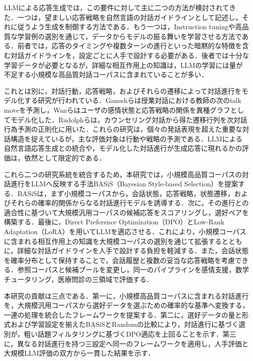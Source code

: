 \documentclass[manuscript,review,anonymous]{acmart}
\begin{document}
LLMによる応答生成では，この要件に対して主に二つの方法が検討されてきた．一つは，望ましい応答戦略を自然言語の対話ガイドラインとして記述し，それに従うよう生成を制御する方法である\cite{gupta2023dialguide,wen2025guidedtod}．もう一つは，Instruction tuningや高品質な学習例の選別を通じて，データからモデルの振る舞いを学習させる方法である\cite{zhou2023lima,zhang2025datasurvey}．前者では，応答のタイミングや複数ターンの進行といった暗黙的な特徴を含む対話ガイドラインを，設定ごとに人手で設計する必要がある．後者では十分な学習データが必要となるが，詳細な相互作用上の知識は，LLMの学習には量が不足する小規模な高品質対話コーパスに含まれていることが多い．

これとは別に，対話行動，応答戦略，およびそれらの遷移によって対話進行をモデル化する研究が行われている．Ganeshらは授業対話における教師の次のtalk moveを予測し\cite{ganesh2021teacher}，Wanらはユーザの感情状態と応答戦略の関係を異種グラフとしてモデル化した\cite{wan2025emodynamix}．Rudolphらは，カウンセリング対話から得た遷移行列を次対話行為予測の正則化に用いた\cite{rudolph2026transition}．これらの研究は，個々の発話表現を超えた重要な対話構造を捉えているが，主な評価対象は行動や戦略の予測である．LLMによる自然言語応答生成との統合や，モデル化した対話進行が生成応答に現れるかの評価は，依然として限定的である．

これら二つの研究系統を統合するため，本研究では，小規模高品質コーパスの対話進行をLLMへ反映する手法BASiS（Bayesian Style-based Selection）を提案する．BASiSは，まず小規模コーパスから，会話状態，応答戦略，状態遷移，およびそれらの確率的関係からなる対話進行モデルを誘導する．次に，その進行との適合性に基づいて大規模汎用コーパスの候補応答をスコアリングし，選好ペアを構築する．最後に，Direct Preference Optimization（DPO）\cite{rafailov2023dpo}とLow-Rank Adaptation（LoRA）\cite{hu2021lora}を用いてLLMを適応させる．これにより，小規模コーパスに含まれる相互作用上の知識を大規模コーパスの選別を通じて拡張するとともに，詳細な対話ガイドラインを人手で設計する負担を軽減する．また，会話状態を確率分布として保持することで，会話履歴と複数の妥当な応答戦略を考慮できる．参照コーパスと候補プールを変更し，同一のパイプラインを感情支援，数学チュータリング，医療問診の三領域で評価する．

本研究の貢献は三点である．第一に，小規模高品質コーパスに含まれる対話進行を，大規模汎用コーパスから選好データを選ぶための確率的な基準へ変換する，一連の処理を統合したフレームワークを提案する．第二に，選好データの量と形式および学習設定を揃えたBASiSとRandomの比較により，対話進行に基づく選別が，粗い話題フィルタリングに基づくDPO適応を上回ることを示す．第三に，異なる対話進行を持つ三設定へ同一のフレームワークを適用し，人手評価と大規模LLM評価の双方から一貫した結果を示す．
\end{document}
